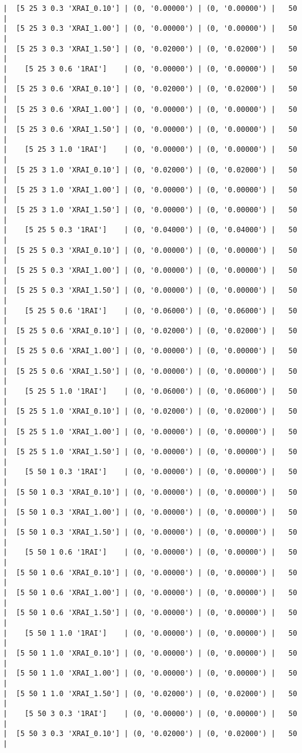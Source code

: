 \documentclass{article}
\begin{document}
\begin{verbatim}
|  [5 25 3 0.3 'XRAI_0.10'] | (0, '0.00000') | (0, '0.00000') |   50  |
|  [5 25 3 0.3 'XRAI_1.00'] | (0, '0.00000') | (0, '0.00000') |   50  |
|  [5 25 3 0.3 'XRAI_1.50'] | (0, '0.02000') | (0, '0.02000') |   50  |
|    [5 25 3 0.6 '1RAI']    | (0, '0.00000') | (0, '0.00000') |   50  |
|  [5 25 3 0.6 'XRAI_0.10'] | (0, '0.02000') | (0, '0.02000') |   50  |
|  [5 25 3 0.6 'XRAI_1.00'] | (0, '0.00000') | (0, '0.00000') |   50  |
|  [5 25 3 0.6 'XRAI_1.50'] | (0, '0.00000') | (0, '0.00000') |   50  |
|    [5 25 3 1.0 '1RAI']    | (0, '0.00000') | (0, '0.00000') |   50  |
|  [5 25 3 1.0 'XRAI_0.10'] | (0, '0.02000') | (0, '0.02000') |   50  |
|  [5 25 3 1.0 'XRAI_1.00'] | (0, '0.00000') | (0, '0.00000') |   50  |
|  [5 25 3 1.0 'XRAI_1.50'] | (0, '0.00000') | (0, '0.00000') |   50  |
|    [5 25 5 0.3 '1RAI']    | (0, '0.04000') | (0, '0.04000') |   50  |
|  [5 25 5 0.3 'XRAI_0.10'] | (0, '0.00000') | (0, '0.00000') |   50  |
|  [5 25 5 0.3 'XRAI_1.00'] | (0, '0.00000') | (0, '0.00000') |   50  |
|  [5 25 5 0.3 'XRAI_1.50'] | (0, '0.00000') | (0, '0.00000') |   50  |
|    [5 25 5 0.6 '1RAI']    | (0, '0.06000') | (0, '0.06000') |   50  |
|  [5 25 5 0.6 'XRAI_0.10'] | (0, '0.02000') | (0, '0.02000') |   50  |
|  [5 25 5 0.6 'XRAI_1.00'] | (0, '0.00000') | (0, '0.00000') |   50  |
|  [5 25 5 0.6 'XRAI_1.50'] | (0, '0.00000') | (0, '0.00000') |   50  |
|    [5 25 5 1.0 '1RAI']    | (0, '0.06000') | (0, '0.06000') |   50  |
|  [5 25 5 1.0 'XRAI_0.10'] | (0, '0.02000') | (0, '0.02000') |   50  |
|  [5 25 5 1.0 'XRAI_1.00'] | (0, '0.00000') | (0, '0.00000') |   50  |
|  [5 25 5 1.0 'XRAI_1.50'] | (0, '0.00000') | (0, '0.00000') |   50  |
|    [5 50 1 0.3 '1RAI']    | (0, '0.00000') | (0, '0.00000') |   50  |
|  [5 50 1 0.3 'XRAI_0.10'] | (0, '0.00000') | (0, '0.00000') |   50  |
|  [5 50 1 0.3 'XRAI_1.00'] | (0, '0.00000') | (0, '0.00000') |   50  |
|  [5 50 1 0.3 'XRAI_1.50'] | (0, '0.00000') | (0, '0.00000') |   50  |
|    [5 50 1 0.6 '1RAI']    | (0, '0.00000') | (0, '0.00000') |   50  |
|  [5 50 1 0.6 'XRAI_0.10'] | (0, '0.00000') | (0, '0.00000') |   50  |
|  [5 50 1 0.6 'XRAI_1.00'] | (0, '0.00000') | (0, '0.00000') |   50  |
|  [5 50 1 0.6 'XRAI_1.50'] | (0, '0.00000') | (0, '0.00000') |   50  |
|    [5 50 1 1.0 '1RAI']    | (0, '0.00000') | (0, '0.00000') |   50  |
|  [5 50 1 1.0 'XRAI_0.10'] | (0, '0.00000') | (0, '0.00000') |   50  |
|  [5 50 1 1.0 'XRAI_1.00'] | (0, '0.00000') | (0, '0.00000') |   50  |
|  [5 50 1 1.0 'XRAI_1.50'] | (0, '0.02000') | (0, '0.02000') |   50  |
|    [5 50 3 0.3 '1RAI']    | (0, '0.00000') | (0, '0.00000') |   50  |
|  [5 50 3 0.3 'XRAI_0.10'] | (0, '0.02000') | (0, '0.02000') |   50  |

\end{verbatim}
\end{document}
